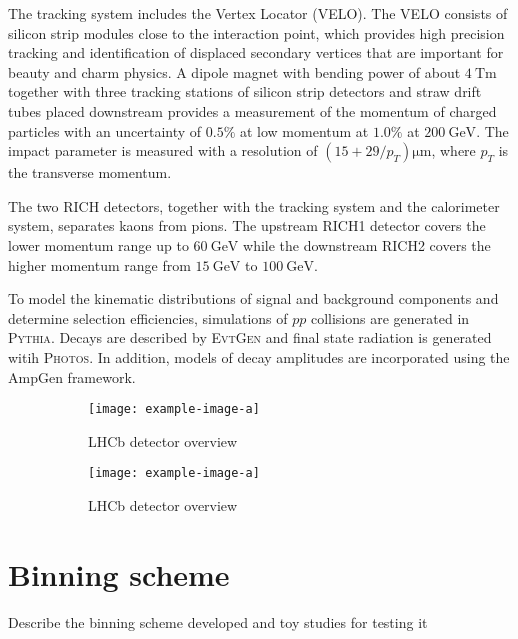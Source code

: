 \documentclass[12pt, a4paper, notitlepage, onecolumn]{article}
\def\pythia     {\mbox{\textsc{Pythia}}\xspace}
\def\evtgen     {\mbox{\textsc{EvtGen}}\xspace}
\def\photos     {\mbox{\textsc{Photos}}\xspace}
\numberwithin{equation}{section}
\begin{document}
The tracking system includes the Vertex Locator (VELO). The VELO consists of silicon strip modules close to the interaction point, which provides high precision tracking and identification of displaced secondary vertices that are important for beauty and charm physics. A dipole magnet with bending power of about $\SI{4}{\tesla\meter}$ together with three tracking stations of silicon strip detectors and straw drift tubes placed downstream provides a measurement of the momentum of charged particles with an uncertainty of $0.5\%$ at low momentum at $1.0\%$ at $\SI{200}{\giga\eV}$. The impact parameter is measured with a resolution of $(15 + 29/p_T)\si{\micro\meter}$, where $p_T$ is the transverse momentum.

The two RICH detectors, together with the tracking system and the calorimeter system, separates kaons from pions. The upstream RICH1 detector covers the lower momentum range up to $\SI{60}{\giga\eV}$ while the downstream RICH2 covers the higher momentum range from $\SI{15}{\giga\eV}$ to $\SI{100}{\giga\eV}$.

To model the kinematic distributions of signal and background components and determine selection efficiencies, simulations of $pp$ collisions are generated in \pythia. Decays are described by \evtgen and final state radiation is generated witih \photos. In addition, models of decay amplitudes are incorporated using the AmpGen framework.

\begin{figure}[H] 
  \centering
  \begin{subfigure}{0.5\textwidth}
    \centering
    \texttt{[image: example-image-a]}
    \caption{LHCb detector overview}
  \end{subfigure}%
  \begin{subfigure}{0.5\textwidth}
    \centering
    \texttt{[image: example-image-a]}
    \caption{LHCb detector overview}
  \end{subfigure}
  \caption{}
  \label{fig_lhcb_detector}
\end{figure}

\section{Binning scheme}
\noindent Describe the binning scheme developed and toy studies for testing it

\end{document}
